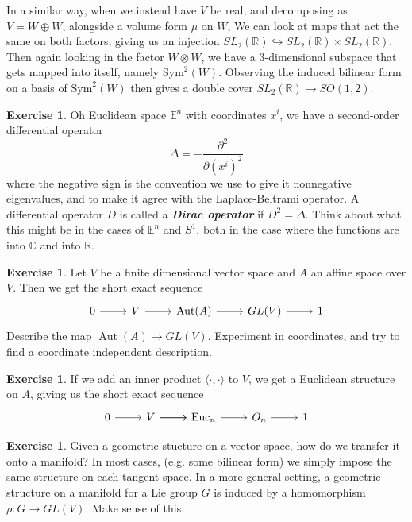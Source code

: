 \documentclass[psamsfonts]{amsart}
\theoremstyle{definition}
\newtheorem{exer}[thm]{Exercise}
\theoremstyle{remark}
\newcommand{\R}{\mathbb{R}}
\newcommand{\ib}[1]{\textbf{\textit{#1}}}
\newcommand{\C}{\mathbb{C}}
\DeclareMathOperator{\Aut}{Aut}
\begin{document}
In a similar way, when we instead have $V$ be real, and decomposing as $V = W \oplus W$, alongside a volume form $\mu$ on $W$, We can look at maps that act the same on both factors, giving us an injection $SL_2(\R) \hookrightarrow SL_2(\R) \times SL_2(\R)$. Then again looking in the factor $W \otimes W$, we have a $3$-dimensional subspace that gets mapped into itself, namely $\mathrm{Sym}^2(W)$. Observing the induced bilinear form on a basis of $\mathrm{Sym}^2(W)$ then gives a double cover $SL_2(\R) \to SO(1,2)$.
%
\begin{exer}
Oh Euclidean space $\mathbb{E}^n$ with coordinates $x^i$, we have a second-order differential operator 
$$\Delta = -\frac{\partial^2}{\partial(x^i)^2} $$
where the negative sign is the convention we use to give it nonnegative eigenvalues, and to make it agree with the Laplace-Beltrami operator. A differential operator $D$ is called a \ib{Dirac operator} if $D^2 = \Delta$. Think about what this might be in the cases of $\mathbb{E}^n$ and $S^1$, both in the case where the functions are into $\C$ and into $\R$.
\end{exer}
%
\begin{exer}
Let $V$ be a finite dimensional vector space and $A$ an affine space over $V$. Then we get the short exact sequence
$$\begin{tikzcd}
0 \ar[r] & V \ar[r] & \Aut(A) \ar[r] & GL(V) \ar[r] & 1
\end{tikzcd}$$
Describe the map $\Aut(A) \to GL(V)$. Experiment in coordinates, and try to find a coordinate independent description.
\end{exer}
%
\begin{exer}
If we add an inner product $\langle \cdot,\cdot \rangle$ to $V$, we get a Euclidean structure on $A$, giving us the short exact sequence
$$ \begin{tikzcd}
0 \ar[r] & \ar[r] V \ar[r] & \mathrm{Euc}_n \ar[r] & O_n \ar[r] & 1 
\end{tikzcd}$$
\end{exer}
%
\begin{exer}
Given a geometric stucture on a vector space, how do we transfer it onto a manifold? In most cases, (e.g. some bilinear form) we simply impose the same structure on each tangent space. In a more general setting, a geometric structure on a manifold for a Lie group $G$ is induced by a homomorphism $\rho : G \to GL(V)$. Make sense of this.
\end{exer}
%
\end{document}

